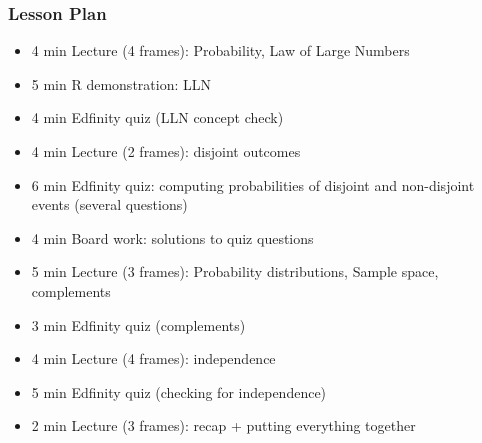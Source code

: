 \begin{frame}
    \frametitle{Lesson Plan}
    \begin{itemize}
        \item 4 min Lecture (4 frames): Probability, Law of Large Numbers
        \item 5 min R demonstration: LLN
        \item 4 min Edfinity quiz (LLN concept check)
        \item 4 min Lecture (2 frames): disjoint outcomes
        \item 6 min Edfinity quiz: computing probabilities of disjoint and non-disjoint events (several questions)
        \item 4 min Board work: solutions to quiz questions
        \item 5 min Lecture (3 frames): Probability distributions, Sample space, complements
        \item 3 min Edfinity quiz (complements)
        \item 4 min Lecture (4 frames): independence
        
        \item 5 min Edfinity quiz (checking for independence)
        \item 2 min Lecture (3 frames): recap + putting everything together
    \end{itemize}
\end{frame}





